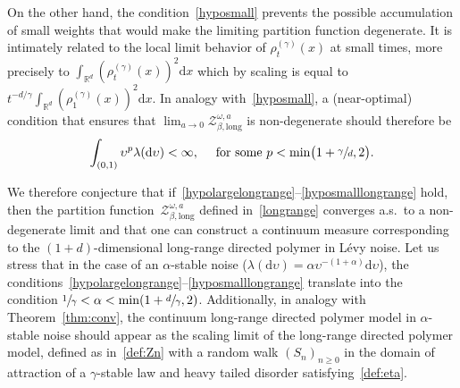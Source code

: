 \documentclass[10pt]{amsart}
\let\mathcal\mathscr
\theoremstyle{definition}
\newcommand{\dd}{\mathrm{d}}
\newcommand{\cZ}{{\ensuremath{\mathcal Z}} }
\newcommand{\bbR}{{\ensuremath{\mathbb R}} }
\let\ga\alpha
\let\gb\beta
\let\ups\upsilon
\let\go\omega
\begin{document}
On the other hand, the condition~\eqref{hyposmall}
prevents the possible accumulation of small weights that would make the limiting partition function degenerate.
It is intimately related to the local limit behavior of $\rho_t^{(\gamma)}(x)$ at small times, more precisely to
$\int_{\bbR^d} (\rho_t^{(\gamma)}(x))^2 \dd x$ which by scaling is equal to $t^{-d/\gamma} \int_{\bbR^d} (\rho_1^{(\gamma)}(x))^2 \dd x.$
In analogy with~\eqref{hyposmall}, a (near-optimal) condition that ensures that $ \lim_{a\to 0}\cZ_{\gb, \mathrm{long}}^{\go,a}$ is non-degenerate should therefore be
\begin{equation}
\label{hyposmalllongrange}
\int_{(0,1)} \ups^{p} \lambda(\dd \ups) <\infty,\quad \text{ for some } p< \min \bigl(1+\sfrac{\gamma}{d}, 2 \bigr).
\end{equation}

We therefore conjecture that if~\eqref{hypolargelongrange}--\eqref{hyposmalllongrange} hold,
then the partition function~$\cZ_{\gb,\mathrm{long}}^{\go,a}$ defined in~\eqref{longrange} converges a.s.\ to a non-degenerate limit and that one can construct a continuum measure corresponding to the $(1+d)$-dimensional long-range directed polymer in Lévy noise.
Let us stress that in the case of an $\ga$-stable noise (\ie $\lambda(\dd \ups) = \ga \ups^{-(1+\ga)} \dd \ups$),
the conditions~\eqref{hypolargelongrange}--\eqref{hyposmalllongrange} translate into the condition $\sfrac1\gamma < \ga < \min(1+\sfrac{d}{\gamma}, 2)$.
Additionally, in analogy with Theorem~\ref{thm:conv}, the continuum long-range directed polymer model in $\ga$-stable noise should appear
as the scaling limit of the long-range
directed polymer model, defined as in~\eqref{def:Zn}
with a random walk $(S_n)_{n\geq 0}$
in the domain of attraction of a $\gamma$-stable law
and heavy tailed disorder satisfying~\eqref{def:eta}.
\end{document}
